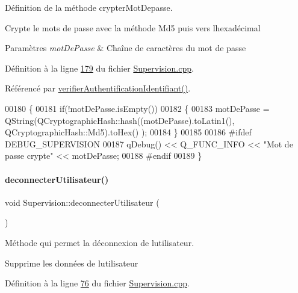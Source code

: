 Définition de la méthode crypter\+Mot\+Depasse. 

Crypte le mots de passe avec la méthode Md5 puis vers l\textquotesingle{}hexadécimal 
\begin{DoxyParams}{Paramètres}
{\em mot\+De\+Passe} & Chaîne de caractères du mot de passe \\
\hline
\end{DoxyParams}


Définition à la ligne \hyperlink{_supervision_8cpp_source_l00179}{179} du fichier \hyperlink{_supervision_8cpp_source}{Supervision.\+cpp}.



Référencé par \hyperlink{_supervision_8cpp_source_l00141}{verifier\+Authentification\+Identifiant()}.


\begin{DoxyCode}
00180 \{
00181     \textcolor{keywordflow}{if}(!motDePasse.isEmpty())
00182     \{
00183     motDePasse = QString(QCryptographicHash::hash((motDePasse).toLatin1(), QCryptographicHash::Md5).toHex()
      );
00184     \}
00185 
00186 \textcolor{preprocessor}{    #ifdef DEBUG\_SUPERVISION}
00187         qDebug() << Q\_FUNC\_INFO << \textcolor{stringliteral}{"Mot de passe crypte"} << motDePasse;
00188 \textcolor{preprocessor}{    #endif}
00189 \}
\end{DoxyCode}
\mbox{\label{class_supervision_a164a1ad89264ea252401818df325eab8}} 
\paragraph{\texorpdfstring{deconnecter\+Utilisateur()}{deconnecterUtilisateur()}}
{\footnotesize\ttfamily void Supervision\+::deconnecter\+Utilisateur (\begin{DoxyParamCaption}{ }\end{DoxyParamCaption})}



Méthode qui permet la déconnexion de l\textquotesingle{}utilisateur. 

Supprime les données de l\textquotesingle{}utilisateur 

Définition à la ligne \hyperlink{_supervision_8cpp_source_l00076}{76} du fichier \hyperlink{_supervision_8cpp_source}{Supervision.\+cpp}.



